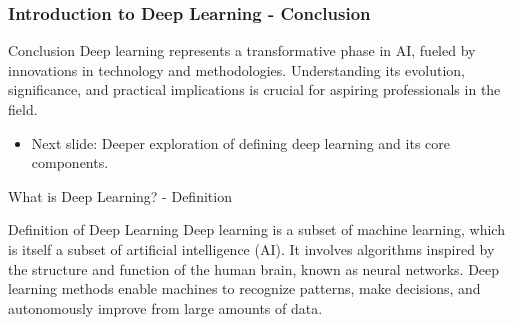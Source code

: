 \documentclass[aspectratio=169]{beamer}
\begin{document}
\begin{frame}[fragile]
    \frametitle{Introduction to Deep Learning - Conclusion}
    \begin{block}{Conclusion}
        Deep learning represents a transformative phase in AI, fueled by innovations in technology and methodologies. 
        Understanding its evolution, significance, and practical implications is crucial for aspiring professionals in the field.
    \end{block}
    \begin{itemize}
        \item Next slide: Deeper exploration of defining deep learning and its core components.
    \end{itemize}
\end{frame}

\begin{frame}[fragile]{What is Deep Learning? - Definition}
    \begin{block}{Definition of Deep Learning}
        Deep learning is a subset of machine learning, which is itself a subset of artificial intelligence (AI). It involves algorithms inspired by the structure and function of the human brain, known as neural networks. Deep learning methods enable machines to recognize patterns, make decisions, and autonomously improve from large amounts of data.
    \end{block}
\end{frame}
\end{document}
